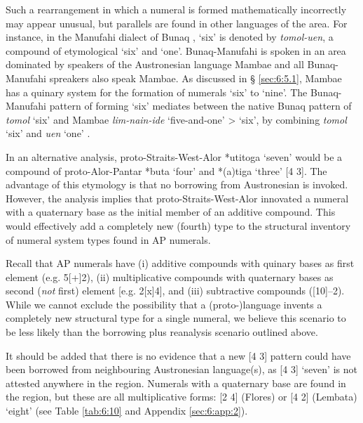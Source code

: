 Such a rearrangement in which a numeral is formed mathematically incorrectly may appear unusual, but parallels are found in other languages of the area. For instance, in the Manufahi dialect of Bunaq \citep[a language related to the Alor-Pantar languages spoken on Timor][]{Schapper2009}, `six' is denoted by \textit{tomol-uen}, a compound of etymological `six' and `one'. Bunaq-Manufahi is spoken in an area dominated by speakers of the Austronesian language Mambae and all Bunaq-Manufahi spreakers also speak Mambae. As discussed in {\S} \ref{sec:6:5.1}, Mambae has a quinary system for the formation of numerals `six' to `nine'. The Bunaq-Manufahi pattern of forming `six' mediates between the native Bunaq pattern of \textit{tomol} `six' and Mambae \textit{lim-nain-ide} `five-and-one' {\textgreater} `six', by combining \textit{tomol} `six' and \textit{uen} `one' .

In an alternative analysis, proto-Straits-West-Alor *{\texthtb}utitoga `seven' would be a compound of proto-Alor-Pantar *buta `four' and *(a)tiga `three' [4 3]. The advantage of this etymology is that no borrowing from Austronesian is invoked. However, the analysis implies that proto-Straits-West-Alor innovated a numeral with a quaternary base as the initial member of an additive compound. This would effectively add a completely new (fourth) type to the structural inventory of numeral system types found in AP numerals. 

Recall that AP numerals have (i) additive compounds with quinary bases as first element (e.g. 5[+]2), (ii) multiplicative compounds with quaternary bases as second (\textit{not} first) element [e.g. 2[x]4], and (iii) subtractive compounds ([10]--2). While we cannot exclude the possibility that a (proto-)language invents a completely new structural type for a single numeral, we believe this scenario to be less likely than the borrowing plus reanalysis scenario outlined above. 

It should be added that there is no evidence that a new [4 3] pattern could have been borrowed from neighbouring Austronesian language(s), as [4 3] `seven' is not attested anywhere in the region. Numerals with a quaternary base are found in the region, but these are all multiplicative forms: [2 4] (Flores) or [4 2] (Lembata) `eight' (see Table \ref{tab:6:10}  and Appendix \ref{sec:6:app:2}). 

